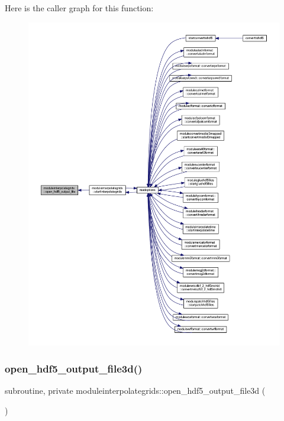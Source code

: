 Here is the caller graph for this function\+:\nopagebreak
\begin{figure}[H]
\begin{center}
\leavevmode
\includegraphics[width=350pt]{namespacemoduleinterpolategrids_adb5ceaa8539e3f7a80b1968dfc2bb3f7_icgraph}
\end{center}
\end{figure}
\mbox{\label{namespacemoduleinterpolategrids_a6d188a490cb72184e7a2cec4c423af97}} 
\subsubsection{\texorpdfstring{open\+\_\+hdf5\+\_\+output\+\_\+file3d()}{open\_hdf5\_output\_file3d()}}
{\footnotesize\ttfamily subroutine, private moduleinterpolategrids\+::open\+\_\+hdf5\+\_\+output\+\_\+file3d (\begin{DoxyParamCaption}{ }\end{DoxyParamCaption})\hspace{0.3cm}{\ttfamily [private]}}

